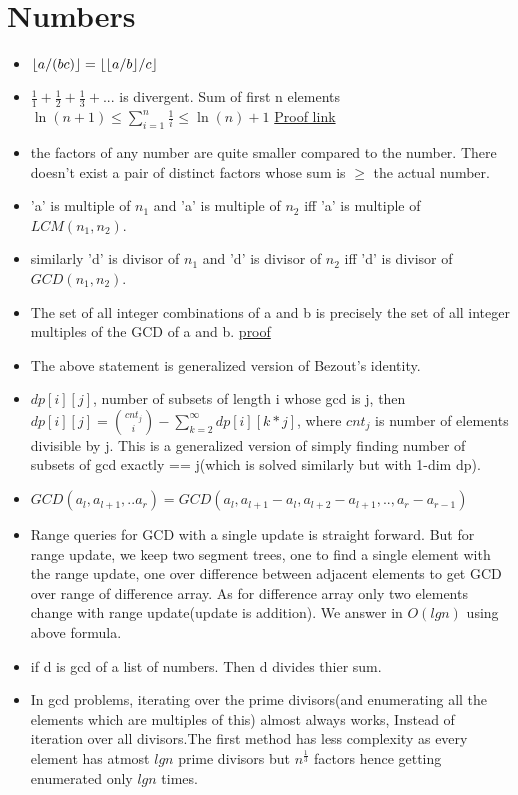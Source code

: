 \documentclass[../Notes.tex]{subfiles}
\begin{document}
\chapter{Numbers}

\begin{itemize}
	\item $\floor*{a/(bc)} = \floor*{\floor*{a/b}/c}$
	\item $\frac{1}{1}+\frac{1}{2}+\frac{1}{3}+...$ is divergent.
	Sum of first n elements \\
	$\ln(n+1)\le\sum_{i=1}^n\frac1i\le\ln(n)+1$
	\href{./Material/divergent series proof.pdf}{Proof link}
	\item the factors of any number are quite smaller compared to the  number. There doesn't exist a pair of distinct factors whose sum is $\geq$ the actual number.
	\item 'a' is multiple of $n_1$ and 'a' is multiple of $n_2$ iff 'a' is multiple of $LCM(n_1,n_2)$. 
	\item similarly 'd' is divisor of $n_1$ and 'd' is divisor of $n_2$ iff 'd' is divisor of $GCD(n_1,n_2)$.
	\item The set of all integer combinations of a and b is precisely the set of all integer multiples of the GCD of a and b. \href{https://proofwiki.org/wiki/Set_of_Integer_Combinations_equals_Set_of_Multiples_of_GCD}{proof}
	\item The above statement is generalized version of Bezout's identity.
	\item $dp[i][j]$, number of subsets of length i whose gcd is j, then\\
	$dp[i][j]={cnt_j\choose i}-\sum_{k=2}^{\infty}dp[i][k*j]$, where $cnt_j$ is number of elements divisible by j. This is a generalized version of simply finding number of subsets of gcd exactly == j(which is solved similarly but with 1-dim dp).
	\item $GCD(a_l,a_{l+1},..a_r) = GCD(a_l,a_{l+1}-a_l,a_{l+2}-a_{l+1},..,a_r-a_{r-1})$
	\item Range queries for GCD with a single update is straight forward. But for range update, we keep two segment trees, one to find a single element with the range update, one over difference between adjacent elements to get GCD over range of difference array. As for difference array only two elements change with range update(update is addition). We answer in $O(lgn)$ using above formula.
	\item if d is gcd of a list of numbers. Then d divides thier sum.
	\item In gcd problems, iterating over the prime divisors(and enumerating all the elements which are multiples of this) almost always works, Instead of iteration over all divisors.The first method has less complexity as every element has atmost $lgn$ prime divisors but $n^\frac{1}{3}$ factors hence getting enumerated only $lgn$ times.
\end{itemize}
\end{document}
